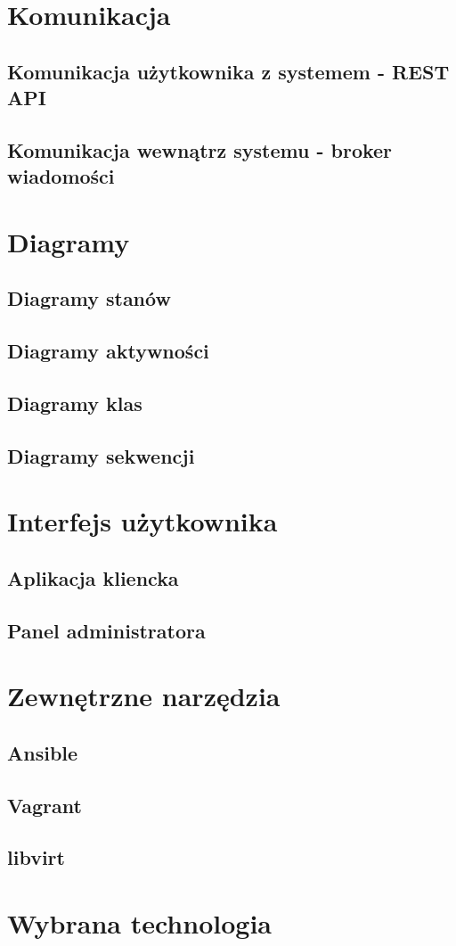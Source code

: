 \documentclass[12pt]{article}
\begin{document}
\section{Komunikacja}

\subsection{Komunikacja użytkownika z systemem - REST API}

\subsection{Komunikacja wewnątrz systemu - broker wiadomości}

\section{Diagramy}

\subsection{Diagramy stanów}

\subsection{Diagramy aktywności}

\subsection{Diagramy klas}

\subsection{Diagramy sekwencji}

\section{Interfejs użytkownika}

\subsection{Aplikacja kliencka}

\subsection{Panel administratora}

\section{Zewnętrzne narzędzia}

\subsection{Ansible}

\subsection{Vagrant}

\subsection{libvirt}

\section{Wybrana technologia}
\end{document}
